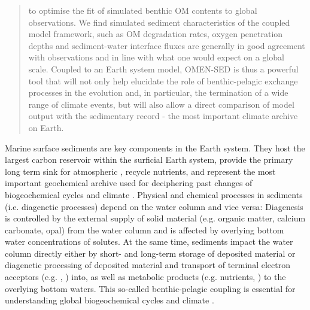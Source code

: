 \documentclass[gmd, manuscript]{copernicus}
\begin{document}
\begin{abstract}
to optimise the fit of simulated benthic OM contents to global observations. 
We find simulated sediment characteristics of the coupled model framework, such as OM degradation rates, oxygen penetration depths and sediment-water interface fluxes
are generally in good agreement with observations and in line with what one would expect on a global scale. 
Coupled to an Earth system model, OMEN-SED is thus a powerful tool that will not only help elucidate the role of benthic-pelagic exchange processes in the evolution and, in particular, the termination of a wide range of climate events, 
but will also allow a direct comparison of model output with the sedimentary record - the most important climate archive on Earth.
\end{abstract}

\newpage

% 


\introduction  %
Marine surface sediments are key components in the Earth system. They host the largest carbon reservoir within the surficial Earth system, provide the primary long term sink for atmospheric , 
recycle nutrients, and represent the most important geochemical archive used for deciphering past changes of biogeochemical cycles and climate  \citep[e.g.][]{berner:91, archer_effect_1994, ridgwell_role_2005, arndt_quantifying_2013}. 
Physical and chemical processes in sediments (i.e. diagenetic processes) depend on the water column and vice versa: Diagenesis is controlled by the external supply of solid material 
(e.g. organic matter, calcium carbonate, opal) from the water column and is affected by overlying bottom water concentrations of solutes. 
At the same time, sediments impact the water column directly either by short- and long-term storage of deposited material or diagenetic processing of deposited material and transport of terminal electron acceptors (e.g. , ) into, 
as well as metabolic products (e.g. nutrients, ) to the overlying bottom waters. 
This so-called benthic-pelagic coupling is essential for understanding global biogeochemical cycles and climate \citep[e.g.][]{archer_effect_1994, archer_what_2000, soetaert_coupling_2000, mackenzie_sediments_2005}. 
\end{document}
